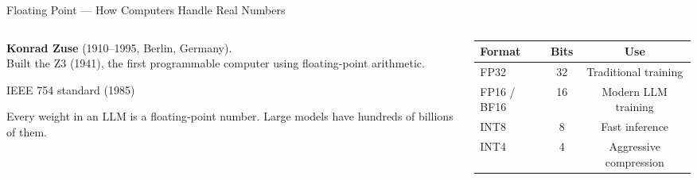 \begin{frame}{Floating Point --- How Computers Handle Real Numbers}

  \begin{columns}[T]
    \begin{column}{0.48\textwidth}
      {\footnotesize
      \textbf{Konrad Zuse} (1910--1995, Berlin, Germany).\\
      Built the \alert{Z3} (1941), the first programmable computer using
      floating-point arithmetic.}

      \vspace{0.3em}
      \begin{tcolorbox}[colback=aiViolet!5, colframe=aiViolet!60,
        fonttitle=\bfseries\small, title={How 3.14159 is stored},
        rounded corners, boxrule=0.5pt, left=3pt, right=3pt, top=3pt, bottom=3pt]
        \footnotesize

        \vspace{2pt}
        {\scriptsize IEEE 754 standard (1985)}
      \end{tcolorbox}

      \vspace{0.3em}
      \begin{insightbox}
        Every weight in an LLM is a floating-point number. Large models
        have hundreds of billions of them.
      \end{insightbox}
    \end{column}

    \begin{column}{0.49\textwidth}
      \begin{tcolorbox}[colback=gray!5, colframe=gray!50,
        fonttitle=\bfseries\small,
        title={Precision vs.\ Speed Trade-off},
        rounded corners, boxrule=0.5pt, left=3pt, right=3pt, top=3pt, bottom=3pt]
        \footnotesize
        \begin{tabular}{@{}lcc@{}}
          \toprule
          \textbf{Format} & \textbf{Bits} & \textbf{Use}\\
          \midrule
          FP32 & 32 & Traditional training\\
          FP16 / BF16 & 16 & Modern LLM training\\
          INT8 & 8 & Fast inference\\
          INT4 & 4 & Aggressive compression\\
          \bottomrule
        \end{tabular}


\end{tcolorbox}
\end{column}
\end{columns}
\end{frame}
